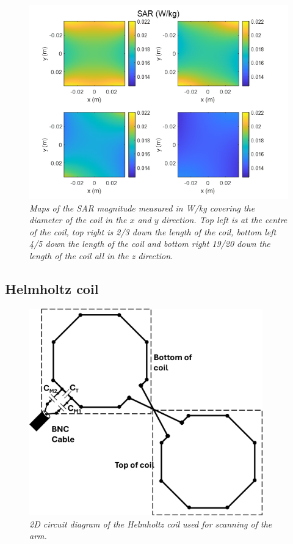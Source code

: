 \begin{figure}[H]
    \centering
    \includegraphics[width=0.9\linewidth]{Figures/Coils/Saddle_SAR.png}
    \caption{\textit{Maps of the SAR magnitude measured in W/kg covering the diameter of the coil in the $x$ and $y$ direction. Top left is at the centre of the coil, top right is 2/3 down the length of the coil, bottom left 4/5 down the length of the coil and bottom right 19/20 down the length of the coil all in the z direction.}}
    \label{fig:coils:Saddle_SAR}
\end{figure}

\subsection{Helmholtz coil}

\begin{figure}
    \centering
    \includegraphics[width=0.9\textwidth]{Figures/Coils/Planar_Helmholtz.png}
    \caption{\textit{2D circuit diagram of the Helmholtz coil used for scanning of the arm.}}
    \label{fig:coils:2D_Helmholtz}
\end{figure}

